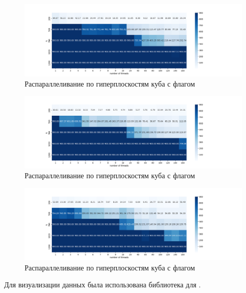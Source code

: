 \begin{figure}[H]
    \centering
    \includegraphics[width=1.\linewidth,center]{openmp_hyperplain_O0.png}
    \caption{Распараллеливание по гиперплоскостям куба с флагом }
\end{figure}

\begin{figure}[H]
    \centering
    \includegraphics[width=1.\linewidth,center]{openmp_hyperplain_O2.png}
    \caption{Распараллеливание по гиперплоскостям куба с флагом }
\end{figure}

\begin{figure}[H]
    \centering
    \includegraphics[width=1.\linewidth,center]{openmp_hyperplain_O3.png}
    \caption{Распараллеливание по гиперплоскостям куба с флагом }
\end{figure}


Для визуализации данных была использована библиотека  для .

